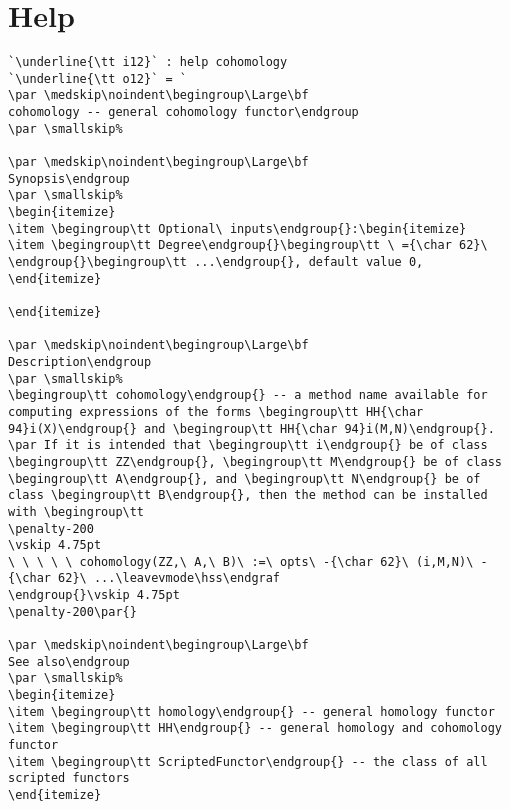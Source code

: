 \documentclass[12pt,a4paper]{amsart}
\begin{document}
\section{Help}
\begin{lstlisting}[language=Macaulay2output]
`\underline{\tt i12}` : help cohomology
`\underline{\tt o12}` = `
\par \medskip\noindent\begingroup\Large\bf
cohomology -- general cohomology functor\endgroup
\par \smallskip%

\par \medskip\noindent\begingroup\Large\bf
Synopsis\endgroup
\par \smallskip%
\begin{itemize}
\item \begingroup\tt Optional\ inputs\endgroup{}:\begin{itemize}
\item \begingroup\tt Degree\endgroup{}\begingroup\tt \ ={\char 62}\ \endgroup{}\begingroup\tt ...\endgroup{}, default value 0,
\end{itemize}

\end{itemize}

\par \medskip\noindent\begingroup\Large\bf
Description\endgroup
\par \smallskip%
\begingroup\tt cohomology\endgroup{} -- a method name available for computing expressions of the forms \begingroup\tt HH{\char 94}i(X)\endgroup{} and \begingroup\tt HH{\char 94}i(M,N)\endgroup{}.
\par If it is intended that \begingroup\tt i\endgroup{} be of class \begingroup\tt ZZ\endgroup{}, \begingroup\tt M\endgroup{} be of class \begingroup\tt A\endgroup{}, and \begingroup\tt N\endgroup{} be of class \begingroup\tt B\endgroup{}, then the method can be installed with \begingroup\tt
\penalty-200
\vskip 4.75pt
\ \ \ \ \ cohomology(ZZ,\ A,\ B)\ :=\ opts\ -{\char 62}\ (i,M,N)\ -{\char 62}\ ...\leavevmode\hss\endgraf
\endgroup{}\vskip 4.75pt
\penalty-200\par{}

\par \medskip\noindent\begingroup\Large\bf
See also\endgroup
\par \smallskip%
\begin{itemize}
\item \begingroup\tt homology\endgroup{} -- general homology functor
\item \begingroup\tt HH\endgroup{} -- general homology and cohomology functor
\item \begingroup\tt ScriptedFunctor\endgroup{} -- the class of all scripted functors
\end{itemize}


\end{lstlisting}
\end{document}
